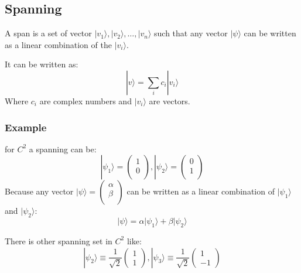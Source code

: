 \documentclass{article}
\begin{document}
\subsection{Spanning}

A span is a set of vector $|v_1\rangle, |v_2\rangle, \dots, |v_n\rangle$ such that any 
vector $|\psi\rangle$ can be written as a linear combination of the $|v_i\rangle$.

It can be written as:
\begin{equation}
    |v\rangle = \sum_i c_i|v_i\rangle
\end{equation}
Where $c_i$ are complex numbers and $|v_i\rangle$ are vectors.

\subsubsection{Example}

for $C^2$ a spanning can be:
\begin{equation}
    |\psi_1\rangle = \begin{pmatrix}
        1 \\
        0 \\
    \end{pmatrix}, |\psi_2\rangle = \begin{pmatrix}
        0 \\
        1 \\
    \end{pmatrix}
\end{equation}
Because any vector $|\psi\rangle = \begin{pmatrix}
    \alpha \\
    \beta \\
\end{pmatrix}$ can be written as a linear combination of $|\psi_1\rangle$ and $|\psi_2\rangle$:
\begin{equation}
    |\psi\rangle = \alpha|\psi_1\rangle + \beta|\psi_2\rangle
\end{equation}

There is other spanning set in $C^2$ like:
\begin{equation}
    |\psi_2\rangle \equiv \frac{1}{\sqrt{2}}\begin{pmatrix}1 \\ 1 \end{pmatrix},
    |\psi_3\rangle \equiv \frac{1}{\sqrt{2}}\begin{pmatrix}1 \\ -1 \end{pmatrix}
\end{equation}
\end{document}
